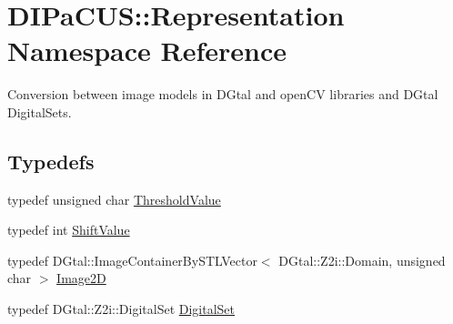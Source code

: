 \hypertarget{namespaceDIPaCUS_1_1Representation}{}\section{D\+I\+Pa\+C\+US\+:\+:Representation Namespace Reference}
\label{namespaceDIPaCUS_1_1Representation}


Conversion between image models in D\+Gtal and open\+CV libraries and D\+Gtal Digital\+Sets.  


\subsection*{Typedefs}
\begin{DoxyCompactItemize}
\item 
typedef unsigned char \hyperlink{namespaceDIPaCUS_1_1Representation_a85996f90f0c4186ddae15b4f372bf875}{Threshold\+Value}
\item 
typedef int \hyperlink{namespaceDIPaCUS_1_1Representation_a6e7d323cc6acfe6cd461f28a986351f5}{Shift\+Value}
\item 
typedef D\+Gtal\+::\+Image\+Container\+By\+S\+T\+L\+Vector$<$ D\+Gtal\+::\+Z2i\+::\+Domain, unsigned char $>$ \hyperlink{namespaceDIPaCUS_1_1Representation_ae97917e89f57298fda1626daad9f1733}{Image2D}
\item 
typedef D\+Gtal\+::\+Z2i\+::\+Digital\+Set \hyperlink{namespaceDIPaCUS_1_1Representation_a6eca0b4fa262f2d600f11d82ee10b5a6}{Digital\+Set}
\end{DoxyCompactItemize}
